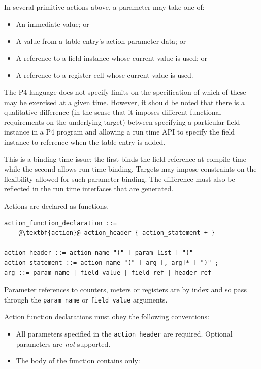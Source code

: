 \documentclass[12pt]{article}
\begin{document}

In several primitive actions above, a parameter may take one of:

\begin{itemize}
\item
An immediate value; or
\item
A value from a table entry's action parameter data; or
\item
A reference to a field instance whose current value is used; or
\item
A reference to a register cell whose current value is used.
\end{itemize}


The P4 language does not specify limits on the specification of which of these 
may be exercised at a given time. However, it should be noted that there is 
a qualitative difference (in the sense that it imposes different functional 
requirements on the underlying target) between specifying a particular field 
instance in a P4 program and allowing a run time API to specify the field 
instance to reference when the table entry is added. 

This is a binding-time issue; the first binds the field reference at compile 
time while the second allows run time binding. Targets may impose constraints 
on the flexibility allowed for such parameter binding. The difference must 
also be reflected in the run time interfaces that are generated.


Actions are declared as functions.

\begin{lstlisting}[frame=single,backgroundcolor=\color{bnfgreen},escapechar=\@]
action_function_declaration ::=
    @\textbf{action}@ action_header { action_statement + }

action_header ::= action_name "(" [ param_list ] ")"
action_statement ::= action_name "(" [ arg [, arg]* ] ")" ;
arg ::= param_name | field_value | field_ref | header_ref
\end{lstlisting}

Parameter references to counters, meters or registers are by index and so 
pass through the \texttt{param_name} or \texttt{field_value} arguments.

Action function declarations must obey the following conventions:

\begin{itemize}
\item
All parameters specified in the \texttt{action_header} are required. Optional parameters 
are \textit{not} supported.
\item
The body of the function contains only:
\end{itemize}
\end{document}
